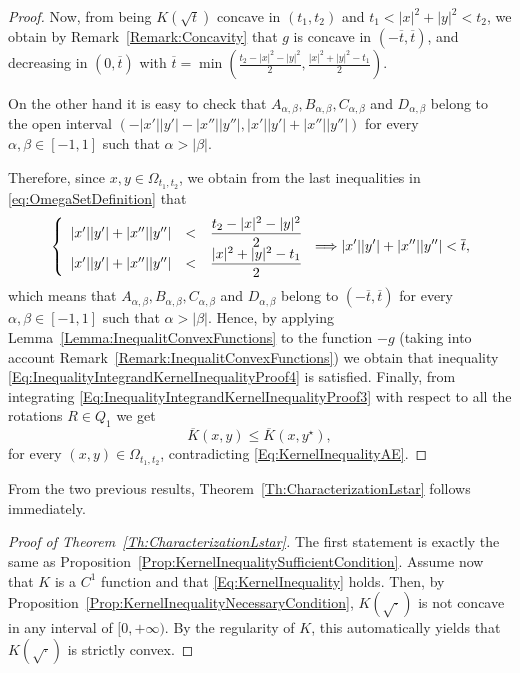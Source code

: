 \begin{proof}
Now, from being $K(\sqrt{t})$ concave in $(t_1,t_2)$ and $t_1<|x|^2+|y|^2<t_2$, we obtain by Remark~\ref{Remark:Concavity} that $g$ is concave in $ \left( -\overline{t}, \overline{t}\right) $, and decreasing in $(0,\overline{t})$ with $\overline{t} = \min{\left(\frac{t_2-|x|^2-|y|^2}{2},\frac{|x|^2+|y|^2-t_1}{2}\right)}$.

On the other hand it is easy to check that $A_{\alpha,\beta}, B_{\alpha,\beta}, C_{\alpha,\beta}$ and $D_{\alpha,\beta}$ belong to the open interval $(-|x'||y'|-|x''||y''|,|x'||y'|+|x''||y''|)$ for every $\alpha, \beta \in [-1,1]$ such that $\alpha>|\beta|$.

Therefore, since $x,y \in \Omega_{t_1,t_2}$, we obtain from the last inequalities in \eqref{eq:OmegaSetDefinition} that
$$
\left\{\begin{array}{rcll}
|x'||y'|+|x''||y''|&<&\dfrac{t_2-|x|^2-|y|^2}{2}\\
|x'||y'|+|x''||y''|&<&\dfrac{|x|^2+|y|^2-t_1}{2}
\end{array} \right. \Longrightarrow  |x'||y'|+|x''||y''|<\overline{t},
$$
which means that $A_{\alpha,\beta}, B_{\alpha,\beta}, C_{\alpha,\beta}$ and $D_{\alpha,\beta}$ belong to $(-\overline{t},\overline{t})$ for every $\alpha, \beta \in [-1,1]$ such that $\alpha>|\beta|$. Hence, by applying Lemma~\ref{Lemma:InequalitConvexFunctions} to the function $-g$ (taking into account Remark~\ref{Remark:InequalitConvexFunctions}) we obtain that inequality \eqref{Eq:InequalityIntegrandKernelInequalityProof4} is satisfied. Finally, from integrating \eqref{Eq:InequalityIntegrandKernelInequalityProof3} with respect to all the rotations $R\in Q_1$ we get $$ \overline{K}(x,y) \leq \overline{K}(x, y^\star),$$ for every $(x,y)\in \Omega_{t_1,t_2}$, contradicting \eqref{Eq:KernelInequalityAE}.
\end{proof}

From the two previous results, Theorem~\ref{Th:CharacterizationLstar} follows immediately.

\begin{proof}[Proof of Theorem~\ref{Th:CharacterizationLstar}]
	The first statement is exactly the same as Proposition~\ref{Prop:KernelInequalitySufficientCondition}. Assume now that $K$ is a $C^1$ function and that \eqref{Eq:KernelInequality} holds. Then, by Proposition~\ref{Prop:KernelInequalityNecessaryCondition}, $K(\sqrt{\cdot})$ is not concave in any interval of $[0,+\infty)$. By the regularity of $K$, this automatically yields that $K(\sqrt{\cdot})$ is strictly convex.
\end{proof}

